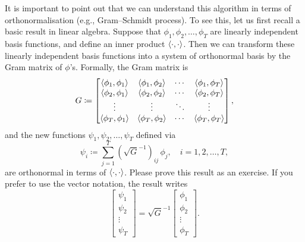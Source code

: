 \documentclass[]{article}
\begin{document}
It is important to point out that we can understand this algorithm in terms of orthonormalisation (e.g., Gram--Schmidt process). To see this, let us first recall a basic result in linear algebra. Suppose that $\phi_1, \phi_2, \ldots, \phi_T$ are linearly independent basis functions, and define an inner product $\langle\cdot, \cdot\rangle$. Then we can transform these linearly independent basis functions into a system of orthonormal basis by the Gram matrix of $\phi$'s. Formally, the Gram matrix is 
%
\begin{equation*}
	G \coloneqq 
	\begin{bmatrix}
		\langle\phi_1, \phi_1\rangle & \langle\phi_1, \phi_2\rangle & \cdots & \langle\phi_1, \phi_T\rangle \\
		\langle\phi_2, \phi_1\rangle & \langle\phi_2, \phi_2\rangle & \cdots & \langle\phi_2, \phi_T\rangle \\
		\vdots & \vdots & \ddots & \vdots \\
		\langle\phi_T, \phi_1\rangle & \langle\phi_T, \phi_2\rangle & \cdots & \langle\phi_T, \phi_T\rangle
	\end{bmatrix},
\end{equation*}
%
and the new functions $\psi_1, \psi_2, \ldots, \psi_T$ defined via
%
\begin{equation*}
	\psi_i \coloneqq \sum_{j=1}^T (\sqrt{G}^{-1})_{ij} \, \phi_j, \quad i=1,2,\ldots, T,
\end{equation*}
%
are orthonormal in terms of $\langle\cdot, \cdot\rangle$. Please prove this result as an exercise. If you prefer to use the vector notation, the result writes
%
\begin{equation*}
	\begin{bmatrix}
		\psi_1 \\
		\psi_2 \\
		\vdots \\
		\psi_T
	\end{bmatrix}
	 = 
	 \sqrt{G}^{-1}
	\begin{bmatrix}
		\phi_1 \\
		\phi_2 \\
		\vdots \\
		\phi_T
	\end{bmatrix}.
\end{equation*}
%
\end{document}
